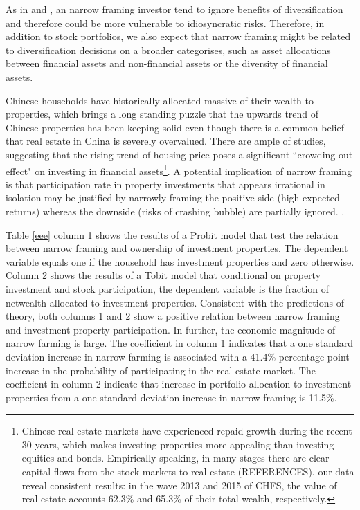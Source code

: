\documentclass[ukenglish,nottitlepage,thmsb,11pt,letterpaper]{article}
\begin{document}
As in \citet{Barberis2006} and \cite{Barberis2009}, an narrow framing investor tend to ignore benefits of diversification and therefore could be more vulnerable to idiosyncratic risks. Therefore, in addition to stock portfolios, we also expect that narrow framing might be related to diversification decisions on a broader categorises, such as asset allocations between financial assets and non-financial assets or the diversity of financial assets. 

Chinese households have historically allocated massive of their wealth to properties, which brings a long standing puzzle that the upwards trend of Chinese properties has been keeping solid even though there is a common belief that real estate in China is severely overvalued. There are ample of studies, suggesting that the rising trend of housing price poses a significant ``crowding-out effect" on investing in financial assets\footnote{Chinese real estate markets have experienced repaid growth during the recent 30 years, which makes investing properties more appealing than investing equities and bonds. Empirically speaking, in many stages there are clear capital flows from the stock markets to real estate (REFERENCES).  our data reveal consistent results: in the wave 2013 and 2015 of CHFS,  the value of real estate accounts 62.3\% and 65.3\% of their total wealth, respectively.}. A potential implication of narrow framing is that participation rate in property investments that appears irrational in isolation may be justified by narrowly framing the positive side (high expected returns) whereas the downside (risks of crashing bubble) are partially ignored. .

Table \ref{eee} column 1 shows the results of a Probit model that test the relation between narrow framing and ownership of investment properties. The dependent variable equals one if the household has investment properties and zero otherwise. Column 2 shows the results of a Tobit model that conditional on property investment and stock participation,  the dependent variable is the fraction of netwealth allocated to investment properties. Consistent with the predictions of theory, both columns 1 and 2 show a positive relation between narrow framing and investment property participation. In further, the economic magnitude of narrow farming is large. The coefficient in column 1 indicates that a one standard deviation increase in narrow farming is associated with a 41.4\% percentage point increase in the probability of participating in the real estate market. The coefficient in column 2 indicate that increase in portfolio allocation to investment properties from a one standard deviation increase in narrow framing is 11.5\%.
\end{document}
